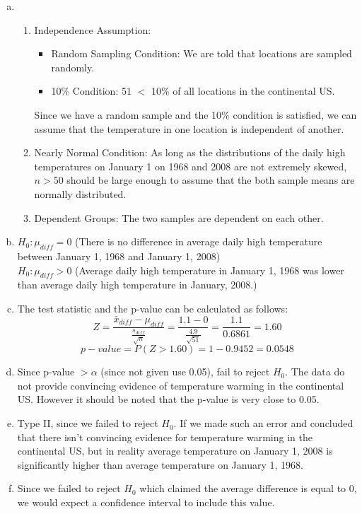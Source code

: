 {{{\begin{enumerate}[(a)]
\item 
\begin{enumerate}[1.]
\item Independence Assumption: 
\begin{itemize}
\item Random Sampling Condition: We are told that locations are sampled randomly.
\item 10\% Condition: 51 $<$ 10\% of all locations in the continental US.
\end{itemize}
Since we have a random sample and the 10\% condition is satisfied, we can assume that the temperature in one location is independent of another.
\item Nearly Normal Condition: As long as the distributions of the daily high temperatures on January 1 on 1968 and 2008 are not extremely skewed, $n > 50$ should be large enough to assume that the both sample means are normally distributed.
\item Dependent Groups: The two samples are dependent on each other.
\end{enumerate}
\item $H_0: \mu_{diff} = 0$ (There is no difference in average daily high temperature between January 1, 1968 and January 1, 2008) \\
$H_0: \mu_{diff} > 0$ (Average daily high temperature in January 1, 1968 was lower than average daily high temperature in January, 2008.)
\item The test statistic and the p-value can be calculated as follows:
\[ Z = \frac{\bar{x}_{diff} - \mu_{diff}}{ \frac{s_{diff}}{\sqrt{n}} } = \frac{1.1 - 0}{\frac{4.9}{\sqrt{51}}} = \frac{1.1}{0.6861} = 1.60 \]
\[ p-value = P(Z > 1.60) = 1 - 0.9452 = 0.0548 \]
\item Since p-value $> \alpha$ (since not given use 0.05), fail to reject $H_0$. The data do not provide convincing evidence of temperature warming in the continental US. However it should be noted that the p-value is very close to 0.05.
\item Type II, since we failed to reject $H_0$. If we made such an error and concluded that there isn't convincing evidence for temperature warming in the continental US, but in reality average temperature on January 1, 2008 is significantly higher than average temperature on January 1, 1968.
\item Since we failed to reject $H_0$ which claimed the average difference is equal to 0, we would expect a confidence interval to include this value.
\end{enumerate}
}\label{temperatureWarming}
}}

